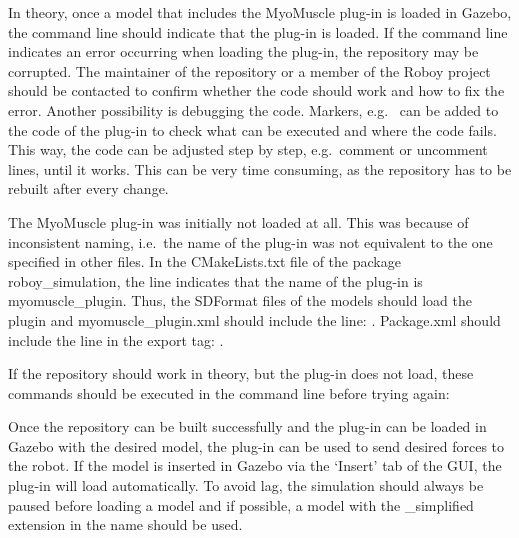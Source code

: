 In theory, once a model that includes the MyoMuscle plug-in is loaded in Gazebo, the command line should indicate that the plug-in is loaded. If the command line indicates an error occurring when loading the plug-in, the repository may be corrupted. The maintainer of the repository or a member of the Roboy project should be contacted to confirm whether the code should work and how to fix the error. Another possibility is debugging the code. Markers, e.g.\  can be added to the code of the plug-in to check what can be executed and where the code fails. This way, the code can be adjusted step by step, e.g.\ comment or uncomment lines, until it works. This can be very time consuming, as the repository has to be rebuilt after every change.


The MyoMuscle plug-in was initially not loaded at all. This was because of inconsistent naming, i.e.\ the name of the plug-in was not equivalent to the one specified in other files. In the CMakeLists.txt file of the package roboy\_simulation, the line  indicates that the name of the plug-in is myomuscle\_plugin. Thus, the SDFormat files of the models should load the plugin  and myomuscle\_plugin.xml should include the line: . Package.xml should include the line in the export tag: .

If the repository should work in theory, but the plug-in does not load, these commands should be executed in the command line before trying again:

Once the repository can be built successfully and the plug-in can be loaded in Gazebo with the desired model, the plug-in can be used to send desired forces to the robot. If the model is inserted in Gazebo via the ‘Insert’ tab of the GUI, the plug-in will load automatically. To avoid lag, the simulation should always be paused before loading a model and if possible, a model with the \_simplified extension in the name should be used.

